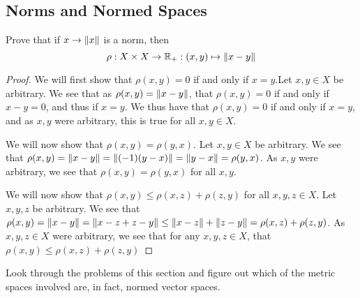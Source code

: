 \subsection{Norms and Normed Spaces}

\begin{minorEx}%
    Prove that if $x \to \Vert x\Vert$ is a norm, then
    \[
        \rho : X \times X \to \mathbb{R}_+ : (x,y) \mapsto \Vert x - y\Vert
    \]
\end{minorEx}

\begin{proof}
  We will first show that $\rho(x,y) =0$ if and only if $x=y$.Let
  $x,y\in X$ be arbitrary.
  We see that as $\rho(x,y)= \Vert x-y\Vert$, that $\rho(x,y)=0$ 
  if and only if $x-y=0$, and thus if $x=y$. We thus have
  that $\rho(x,y) =0$ if and only if $x=y$, and as $x,y$ were
  arbitrary, this is true for all $x,y\in X$.

  We will now show that $\rho(x,y)= \rho(y,x)$. Let $x,y\in X$ be
  arbitrary. We see that $\rho(x,y)
  = \Vert x-y\Vert=\Vert({-1})(y-x)\Vert=\Vert y-x\Vert= \rho(y,x)$. As $x,y$
  were arbitrary, we see that $\rho(x,y)= \rho(y,x)$ for all $x,y$.

  We will now show that $\rho(x,y) \leq \rho(x,z) + \rho(z,y)$ for all
  $x,y,z \in X$. Let $x,y,z$ be arbitrary. We see that 
  $\rho(x,y) = \Vert x-y\Vert =
  \Vert x-z +z -y\Vert \leq \Vert x-z\Vert+\Vert z-y\Vert= \rho(x,z) + \rho(z,y)$.
  As $x,y,z\in X$ were arbitrary, we see that for any $x,y,z\in X$,
  that $\rho(x,y) \leq \rho(x,z) + \rho(z,y)$
\end{proof}

\begin{minorEx}%
    Look through the problems of this section and figure out which 
    of the metric spaces involved are, in fact, normed vector spaces.
\end{minorEx}

